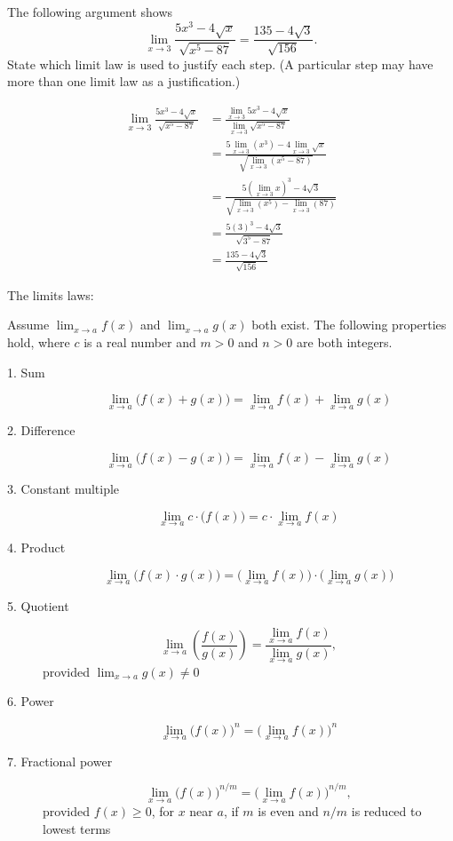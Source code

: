 \documentclass[handout,nooutcomes]{ximera}
\begin{document}
\begin{problem}
  \label{problem:identify-application-of-limit-laws}
  The following argument shows 
  \[
    \lim_{x \to 3} \frac{5x^3 - 4 \sqrt{x}}{\sqrt{x^5 - 87}} = \frac{135 - 4\sqrt{3}}{\sqrt{156}}.
  \]
  State which limit law is used to justify each step.
  (A particular step may have more than one limit law as a justification.)

  \begin{align*}
    \lim_{x \to 3} \frac{5x^3 - 4 \sqrt{x}}{\sqrt{x^5 - 87}}
    &= \frac{\lim_{x \to 3} 5x^3 - 4 \sqrt{x}}{\lim_{x \to 3}\sqrt{x^5 - 87}}\\
    &= \frac{5\lim_{x \to 3}(x^3) - 4 \lim_{x \to 3}\sqrt{x}}{\sqrt{\lim_{x \to 3}(x^5 - 87)}}\\
    &= \frac{5(\lim_{x \to 3}x)^3 - 4 \sqrt{3}}{\sqrt{\lim_{x \to 3}(x^5) - \lim_{x \to 3} (87)}}\\
    &= \frac{5(3)^3 - 4 \sqrt{3}}{\sqrt{3^5 - 87}}\\
    &= \frac{135 - 4\sqrt{3}}{\sqrt{156}}
  \end{align*}

  The limits laws:
  
  Assume $\lim_{x \to a} f(x)$ and $\lim_{x \to a} g(x)$ both exist.
  The following properties hold, where $c$ is a real number and $m > 0$ and $n > 0$ are both integers.
  \begin{description}
      \item[1. Sum]
        \[
          \lim_{x \to a} \bigl(f(x) + g(x)\bigr) = \lim_{x \to a} f(x) + \lim_{x \to a} g(x)
        \]

      \item[2. Difference]
        \[
          \lim_{x \to a} \bigl(f(x) - g(x)\bigr) = \lim_{x \to a} f(x) - \lim_{x \to a} g(x)
        \]

      \item[3. Constant multiple]
        \[
          \lim_{x \to a} c \cdot \bigl( f(x) \bigr) = c \cdot \lim_{x \to a} f(x)
        \]

      \item[4. Product]
        \[
          \lim_{x \to a} \bigl(f(x) \cdot g(x)\bigr) = \bigl(\lim_{x \to a} f(x)\bigr) \cdot \bigl(\lim_{x \to a} g(x) \bigr)
        \]

      \item[5. Quotient]
        \[
          \lim_{x \to a} \left(\frac{f(x)}{g(x)}\right) = \frac{\lim_{x \to a} f(x)}{\lim_{x \to a} g(x)},
        \]
        provided $\lim_{x \to a} g(x) \ne 0$

      \item[6. Power]
        \[
          \lim_{x \to a} \bigl(f(x)\bigr)^n = \bigl(\lim_{x \to a} f(x)\bigr)^n
        \]

      \item[7. Fractional power]
        \[
          \lim_{x \to a} \bigl(f(x)\bigr)^{n/m} = \bigl(\lim_{x \to a} f(x)\bigr)^{n/m},
        \]
        provided $f(x) \ge 0$, for $x$ near $a$, if $m$ is even and $n/m$ is reduced to lowest terms
    \end{description}
\end{problem}
\end{document}
